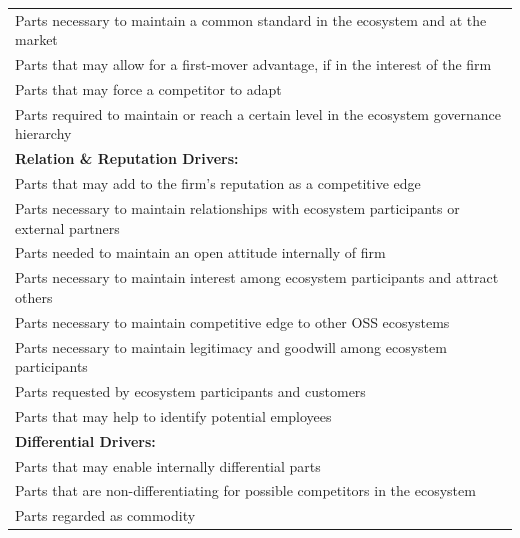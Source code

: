 \documentclass[a4paper]{llncs}
\begin{document}
\begin{table}[t!]
\begin{tabular}{p{12.1cm}}
    \midrule
    \footnotesize
    Parts necessary to maintain a common standard in the ecosystem and at the market
    \\ 
    \footnotesize
    Parts that may allow for a first-mover advantage, if in the interest of the firm
    \\ 
    \footnotesize
    Parts that may force a competitor to adapt
    \\ 
    \footnotesize
    Parts required to maintain or reach a certain level in the ecosystem governance hierarchy
    \\ 
    \midrule
    \footnotesize
\textbf{Relation \& Reputation Drivers:}
    \\ 
    \midrule
    \footnotesize
    Parts that may add to the firm’s reputation as a competitive edge
    \\ 
    \footnotesize
    Parts necessary to maintain relationships with ecosystem participants or external partners
    \\ 
    \footnotesize
    Parts needed to maintain an open attitude internally of firm
    \\ 
    \footnotesize
    Parts necessary to maintain interest among ecosystem participants and attract others
    \\ 
    \footnotesize
    Parts necessary to maintain competitive edge to other OSS ecosystems
    \\ 
    \footnotesize
    Parts necessary to maintain legitimacy and goodwill among ecosystem participants
    \\ 
    \footnotesize
    Parts requested by ecosystem participants and customers
    \\ 
    \footnotesize
    Parts that may help to identify potential employees
    \\ 
    \midrule
    \footnotesize
\textbf{Differential Drivers:}
    \\ 
    \midrule
    \footnotesize
    Parts that may enable internally differential parts
    \\ 
    \footnotesize
    Parts that are non-differentiating for possible competitors in the ecosystem
    \\ 
    \footnotesize
    Parts regarded as commodity
    \\ \bottomrule
\end{tabular}
\vspace{-0.5cm}
\end{table}

\end{document}

